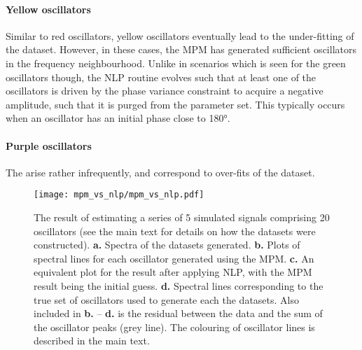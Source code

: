 \paragraph{Yellow oscillators}
Similar to red oscillators, yellow oscillators eventually lead to the
under-fitting of the dataset. However, in these cases, the \ac{MPM} has
generated sufficient oscillators in the frequency neighbourhood. Unlike in
scenarios which is seen for the green oscillators though, the \ac{NLP} routine
evolves such that at least one of the oscillators is driven by the phase
variance constraint to acquire a negative amplitude, such that it is purged
from the parameter set. This typically occurs when an oscillator has an initial
phase close to \ang{180}.

\paragraph{Purple oscillators}
The arise rather infrequently, and correspond to over-fits of the dataset.


\begin{sidewaysfigure}
    \centering
    \texttt{[image: mpm\_vs\_nlp/mpm\_vs\_nlp.pdf]}
    \caption[
        The result of estimating a series of 5 simulated signals comprising 20
        oscillators, using solely the \acs{MPM} and also with phase
        variance-regularised \acs{NLP} afterwards.
    ]{
        The result of estimating a series of 5 simulated signals comprising 20
        oscillators (see the main text for details on how the datasets were constructed).
        \textbf{a.} Spectra of the datasets generated.
        \textbf{b.} Plots of spectral lines for each oscillator generated using
        the \acs{MPM}.
        \textbf{c.} An equivalent plot for the result after applying \acs{NLP},
        with the \ac{MPM} result being the initial guess.
        \textbf{d.} Spectral lines corresponding to the true set of oscillators
        used to generate each the datasets.
        Also included in \textbf{b.} -- \textbf{d.} is the residual between the
        data and the sum of the oscillator peaks (grey line).
        The colouring of oscillator lines is described in the main text.
    }
    \label{fig:mpm_vs_nlp}
\end{sidewaysfigure}
